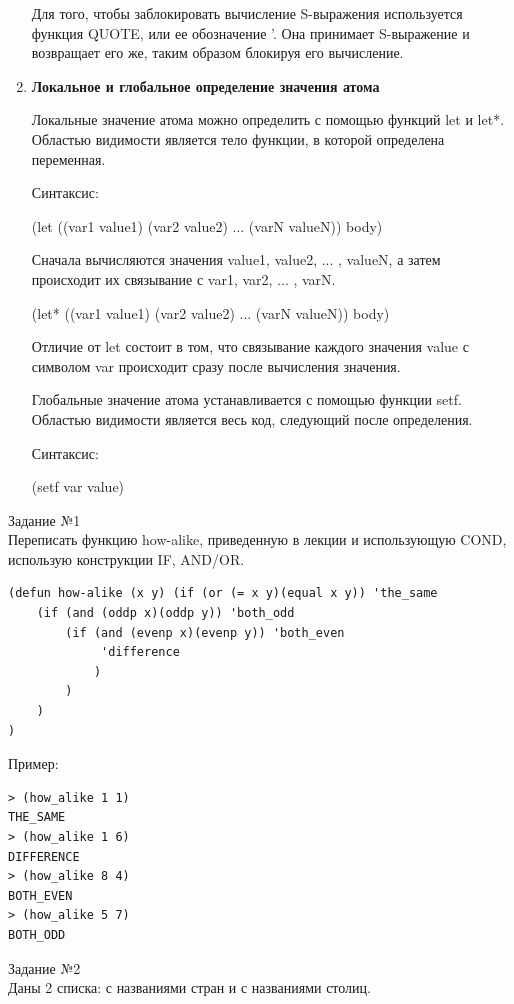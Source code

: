 \begin{enumerate}
Для того, чтобы заблокировать вычисление S-выражения используется функция QUOTE, или ее обозначение '. Она принимает S-выражение и возвращает его же, таким образом блокируя его вычисление.

\item \textbf{Локальное и глобальное определение значения атома}

Локальные значение атома можно определить с помощью функций let и let*. Областью видимости является тело функции, в которой определена переменная.

Синтаксис:

(let ((var1 value1) (var2 value2) ... (varN valueN)) body)

Сначала вычисляются значения value1, value2, ... , valueN, а затем происходит их связывание с var1, var2, ... , varN. 

(let* ((var1 value1) (var2 value2) ... (varN valueN)) body)

Отличие от let состоит в том, что связывание каждого значения value с символом var происходит сразу после вычисления значения.

Глобальные значение атома устанавливается с помощью функции setf. Областью видимости является весь код, следующий после определения.

Синтаксис: 

(setf var value)
\end{enumerate}
\newpage
\vspace*{10mm}
{\LARGE Задание №1}\\

Переписать функцию how-alike, приведенную в лекции и использующую COND, использую конструкции IF, AND/OR.

\begin{lstlisting}[caption=Переписанная функция how-alike]
(defun how-alike (x y) (if (or (= x y)(equal x y)) 'the_same
	(if (and (oddp x)(oddp y)) 'both_odd
		(if (and (evenp x)(evenp y)) 'both_even
			 'difference
			)
		)
	)
)
\end{lstlisting}

Пример:
\begin{lstlisting}
> (how_alike 1 1)
THE_SAME
> (how_alike 1 6)
DIFFERENCE
> (how_alike 8 4)
BOTH_EVEN
> (how_alike 5 7)
BOTH_ODD
\end{lstlisting}

{\LARGE Задание №2}\\

Даны 2 списка: с названиями стран и с названиями столиц.

